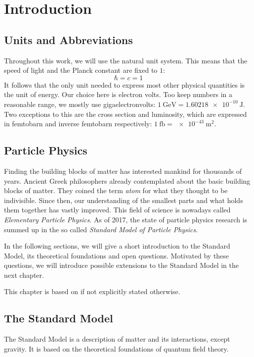 
\chapter{Introduction}


\section{Units and Abbreviations}
Throughout this work, we will use the natural unit system. This means that the speed of light and the Planck constant are fixed to $1$:
\begin{equation*}
    \hbar = c = 1
\end{equation*}
It follows that the only unit needed to express most other physical quantities is the unit of energy. Our choice here is electron volts. Too keep numbers in a reasonable range, we mostly use gigaelectronvolts: $\SI{1}{\giga\eV} = \SI{1.60218e-10}{\joule}$.
Two exceptions to this are the cross section and luminosity, which are expressed in femtobarn and inverse femtobarn respectively: $\SI{1}{\femto\barn} = \SI{e-43}{\meter\squared}$.

\section{Particle Physics}
Finding the building blocks of matter has interested mankind for thousands of years. Ancient Greek philosophers already contemplated about the basic building blocks of matter. They coined the term \emph{atom} for what they thought to be indivisible. Since then, our understanding of the smallest parts and what holds them together has vastly improved. This field of science is nowadays called \emph{Elementary Particle Physics}. As of 2017, the state of particle physics research is summed up in the so called \emph{Standard Model of Particle Physics}.

In the following sections, we will give a short introduction to the Standard Model, its theoretical foundations and open questions. Motivated by these questions, we will introduce possible extensions to the Standard Model in the next chapter.

This chapter is based on \cite{Hebbeker:SkriptzurElementarteilchenphysik} if not explicitly stated otherwise.

\section{The Standard Model}
The Standard Model is a description of matter and its interactions, except gravity. It is based on the theoretical foundations of quantum field theory.


